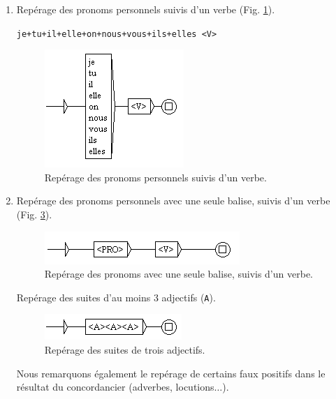 \documentclass[xcolor={table,usenames,dvipsnames}]{article}
\begin{document}
\begin{enumerate}
	\item 
	Repérage des pronoms personnels suivis d'un verbe (Fig. \ref{fig:jetuil}).
	
	\texttt{je+tu+il+elle+on+nous+vous+ils+elles <V>}
	
			\begin{figure}[H] %
		\centering
		\includegraphics[width=.3\linewidth]{img/jetuil.png}
		\caption{Repérage des pronoms personnels suivis d'un verbe.}
		\label{fig:jetuil}
	\end{figure}
	
	\item Repérage des pronoms personnels avec une seule balise, suivis d'un verbe (Fig. \ref{fig:jetuil_balise}).
		\begin{figure}[H] %
		\centering
		\includegraphics[width=1\linewidth]{img/pronom_verbe.png}
		\caption{Repérage des pronoms avec une seule balise, suivis d'un verbe.}
		\label{fig:jetuil_balise}
	\end{figure}
	
	Repérage des suites d'au moins 3 adjectifs (\texttt{A}).
			\begin{figure}[H] %
		\centering
		\includegraphics[width=.7\linewidth]{img/adjectifs.png}
		\caption{Repérage des suites de trois adjectifs.}
		\label{fig:jetuil_balise}
	\end{figure}
	
	Nous remarquons également le repérage de certains faux positifs dans le résultat du concordancier (adverbes, locutions$\dots$).
	

\end{enumerate}
\end{document}
